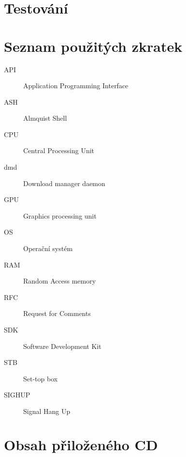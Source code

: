 \documentclass[thesis=B,czech]{FITthesis}[2012/06/26]
\begin{document}
\chapter{Testování}

\begin{conclusion}

\end{conclusion}




\appendix

\chapter{Seznam použitých zkratek}
\begin{description}
	\item[API] Application Programming Interface
	\item[ASH] Almquist Shell
	\item[CPU] Central Processing Unit
	\item[dmd] Download manager daemon
	\item[GPU] Graphics processing unit
	\item[OS] Operační systém
	\item[RAM] Random Access memory
	\item[RFC] Request for Comments
	\item[SDK] Software Development Kit
	\item[STB] Set-top box
	\item[SIGHUP] Signal Hang Up
\end{description}

\chapter{Obsah přiloženého CD}

\begin{figure}
\end{figure}
\end{document}
